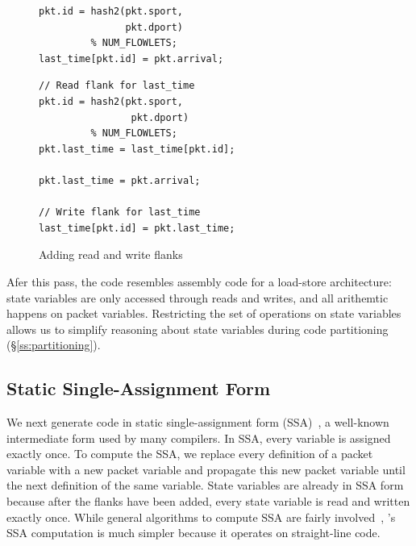 \begin{figure}[!t]
  \begin{minipage}{0.47\textwidth}
  \begin{small}
  \begin{lstlisting}[style=customc]
pkt.id = hash2(pkt.sport,
               pkt.dport)
         % NUM_FLOWLETS;
last_time[pkt.id] = pkt.arrival;
  \end{lstlisting}
  \end{small}
  \end{minipage}
  \begin{minipage}{0.53\textwidth}
  \begin{small}
  \begin{lstlisting}[style=customc]
// Read flank for last_time
pkt.id = hash2(pkt.sport,
                pkt.dport)
         % NUM_FLOWLETS;
pkt.last_time = last_time[pkt.id];

pkt.last_time = pkt.arrival;

// Write flank for last_time
last_time[pkt.id] = pkt.last_time;
  \end{lstlisting}
  \end{small}
  \end{minipage}
  \caption{Adding read and write flanks}
\label{fig:stateful_flanks}
\end{figure}

Afer this pass, the code resembles assembly code for a load-store architecture:
state variables are only accessed through reads and writes, and all arithemtic
happens on packet variables. Restricting the set of operations on state
variables allows us to simplify reasoning about state variables during code
partitioning (\S\ref{ss:partitioning}).

\subsection{Static Single-Assignment Form}
We next generate code in static single-assignment form
(SSA)~\cite{ssa}, a well-known intermediate form used by many
compilers. In SSA, every variable is assigned exactly once. To compute the SSA,
we replace every definition of a packet variable with a new packet variable and
propagate this new packet variable until the next definition of the same
variable. State variables are already in SSA form because after the flanks have been
added, every state variable is read and written exactly once.
While general algorithms to compute SSA are fairly
involved~\cite{ssa}, \pktlanguage's SSA computation is much simpler
because it operates on straight-line code.

